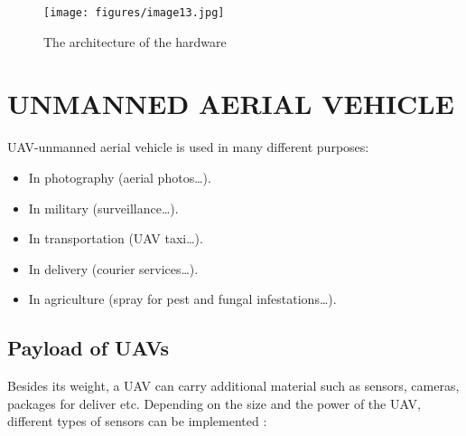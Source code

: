 \documentclass[12pt]{book}
\begin{document}
\begin{figure}[!htbp]
\centering
  \texttt{[image: figures/image13.jpg]}
  \\
  \caption{The architecture of the hardware \cite{TSA2016}}
  \label{fig:fig11}
\end{figure}

\section{UNMANNED AERIAL VEHICLE}
UAV-unmanned aerial vehicle is used in many different purposes: 

\begin{itemize}
    \item In photography (aerial photos…).
    \item In military (surveillance…).
    \item In transportation (UAV taxi…).
    \item In delivery (courier services…).
    \item In agriculture (spray for pest and fungal infestations…). 
\end{itemize}

\subsection{Payload of UAVs}
Besides its weight, a UAV can carry additional material such as sensors, cameras, packages for deliver etc. Depending on the size and the power of the UAV, different types of sensors can be implemented \cite{AZO}: 
\end{document}
